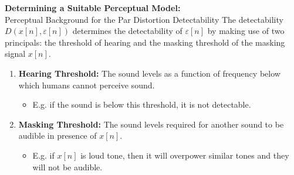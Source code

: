 \documentclass[aspectratio=169]{beamer}
\begin{document}
\begin{frame}{\textbf{Determining a Suitable Perceptual Model:}\\ Perceptual Background for the Par Distortion Detectability}
    The detectability $D(x[n], \varepsilon[n])$ determines the detectability of $\varepsilon[n]$ by making use of two principals: the threshold of hearing 
    and the masking threshold of the masking signal $x[n]$.
    \vspace{10pt}
    \begin{enumerate}
        \item \textbf{Hearing Threshold:} The sound levels as a function of frequency below which humans cannot perceive sound.
            \begin{itemize}
                \item E.g. if the sound is below this threshold, it is not detectable.
            \end{itemize}
        \vspace{10pt}
        \item \textbf{Masking Threshold:} The sound levels required for another sound to be audible in presence of $x[n]$.
            \begin{itemize}
                \item E.g. if $x[n]$ is loud tone, then it will overpower similar tones and they will not be audible.
            \end{itemize}
    \end{enumerate}
\end{frame}

\end{document}

